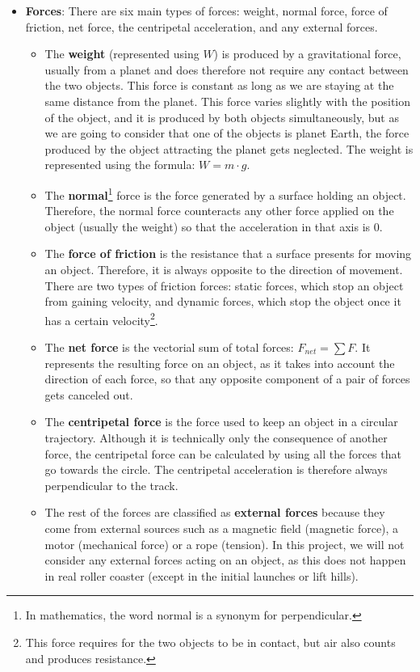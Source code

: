 \documentclass[12pt,twoside,a4paper]{article}
\begin{document}
\begin{itemize}
		\item \textbf{Forces}: There are six main types of forces: weight, normal force, force of friction, net force, the centripetal acceleration, and any external forces.
			\begin{itemize}
				\item The \textbf{weight} (represented using $W$) is produced by a gravitational force, usually from a planet and does therefore not require any contact between the two objects. This force is constant as long as we are staying at the same distance from the planet. This force varies slightly with the position of the object, and it is produced by both objects simultaneously, but as we are going to consider that one of the objects is planet Earth, the force produced by the object attracting the planet gets neglected. The weight is represented using the formula: $W = m \cdot g$.
				\item The \textbf{normal}\footnote{In mathematics, the word normal is a synonym for perpendicular.} force is the force generated by a surface holding an object. Therefore, the normal force counteracts any other force applied on the object (usually the weight) so that the acceleration in that axis is $0$.
				\item The \textbf{force of friction} is the resistance that a surface presents for moving an object. Therefore, it is always opposite to the direction of movement. There are two types of friction forces: static forces, which stop an object from gaining velocity, and dynamic forces, which stop the object once it has a certain velocity\footnote{This force requires for the two objects to be in contact, but air also counts and produces resistance.}.
				\item The \textbf{net force} is the vectorial sum of total forces: $F_{net} = \sum F$. It represents the resulting force on an object, as it takes into account the direction of each force, so that any opposite component of a pair of forces gets canceled out.
				\item The \textbf{centripetal force} is the force used to keep an object in a circular trajectory. Although it is technically only the consequence of another force, the centripetal force can be calculated by using all the forces that go towards the circle. The centripetal acceleration is therefore always perpendicular to the track.
				\item The rest of the forces are classified as \textbf{external forces} because they come from external sources such as a magnetic field (magnetic force), a motor (mechanical force) or a rope (tension). In this project, we will not consider any external forces acting on an object, as this does not happen in real roller coaster (except in the initial launches or lift hills).
			\end{itemize}
		

\end{itemize}
\end{document}
